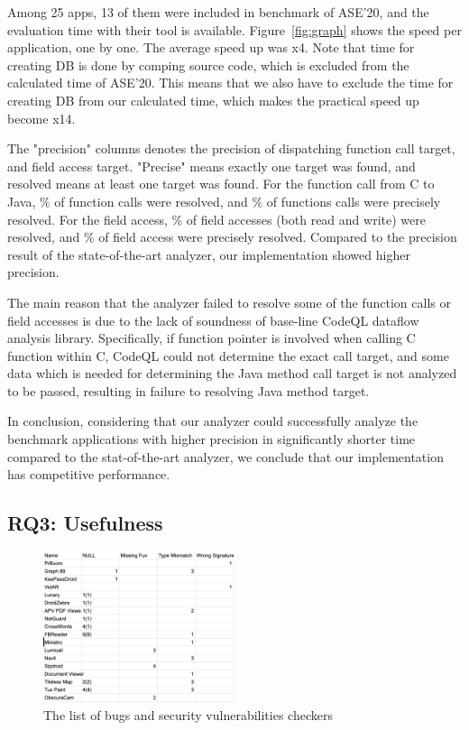 Among 25 apps, 13 of them were included in benchmark of ASE'20, and the
evaluation time with their tool is available.  Figure~\ref{fig:graph} shows the speed per
application, one by one.  The average speed up was x4. Note that time for
creating DB is done by comping source code, which is excluded from the calculated
time of ASE'20. This means that we also have to exclude the time for creating DB
from our calculated time, which makes the practical speed up become x14.

The "precision" columns denotes the precision of dispatching function call
target, and field access target.  "Precise" means exactly one target was found,
and resolved means at least one target was found. For the function call from C to Java,
\% of function calls were resolved, and \% of functions calls
were precisely resolved. For the field access, \% of field accesses (both
read and write) were resolved, and \% of field access were precisely resolved.
Compared to the precision result of the state-of-the-art analyzer, our implementation
showed higher precision.

The main reason that the analyzer failed to resolve some of the function calls
or field accesses is due to the lack of soundness of base-line CodeQL dataflow
analysis library.  Specifically, if function pointer is involved when calling C
function within C, CodeQL could not determine the exact call target, and some
data which is needed for determining the Java method call target is not
analyzed to be passed, resulting in failure to resolving Java method target.

In conclusion, considering that our analyzer could successfully analyze the
benchmark applications with higher precision in significantly shorter time
compared to the stat-of-the-art analyzer, we conclude that our implementation
has competitive performance.

\subsection{RQ3: Usefulness}
\begin{figure}[t]
  \centering
  \vspace{2mm}
  \includegraphics[width=0.5\textwidth]{img/table3}
  \vspace*{-1.5em}
  \caption{The list of bugs and security vulnerabilities checkers}
  \label{fig:table3}
\vspace*{-.5em}
\end{figure}

